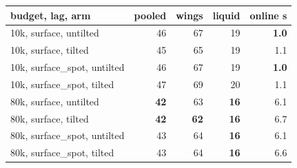 \begin{tabular}{l rrr r}
\toprule
budget, lag, arm & pooled & wings & liquid & online s\\
\midrule
10k, surface, untilted & 46 & 67 & 19 & \textbf{1.0}\\
10k, surface, tilted & 45 & 65 & 19 & 1.1\\
10k, surface\_spot, untilted & 46 & 67 & 19 & \textbf{1.0}\\
10k, surface\_spot, tilted & 47 & 69 & 20 & 1.1\\
80k, surface, untilted & \textbf{42} & 63 & \textbf{16} & 6.1\\
80k, surface, tilted & \textbf{42} & \textbf{62} & \textbf{16} & 6.7\\
80k, surface\_spot, untilted & 43 & 64 & \textbf{16} & 6.1\\
80k, surface\_spot, tilted & 43 & 64 & \textbf{16} & 6.6\\
\bottomrule
\end{tabular}
